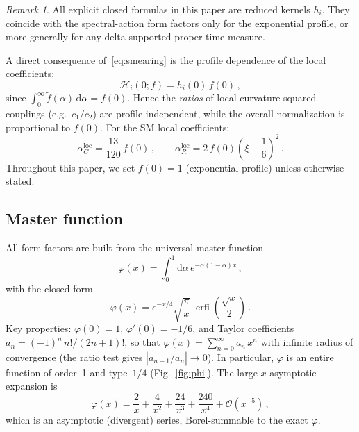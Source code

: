 \documentclass[aps,prd,twocolumn,superscriptaddress,nofootinbib,floatfix]{revtex4-2}
\theoremstyle{definition}
\theoremstyle{remark}
\newtheorem{remark}[theorem]{Remark}
\newcommand{\dd}{\mathrm{d}}
\newcommand{\erfi}{\operatorname{erfi}}
\begin{document}
\begin{remark}
All explicit closed formulas in this paper are reduced kernels $h_i$. They
coincide with the spectral-action form factors only for the exponential
profile, or more generally for any delta-supported proper-time measure.
\end{remark}

A direct consequence of~\eqref{eq:smearing} is the profile dependence of the
local coefficients:
\begin{equation}
  \mathcal{H}_i(0;f) = h_i(0)\,f(0)\,,
  \label{eq:f0-factor}
\end{equation}
since $\int_0^\infty \tilde{f}(\alpha)\,\dd\alpha = f(0)$.
Hence the \emph{ratios} of local curvature-squared couplings (e.g.\
$c_1/c_2$) are profile-independent, while the overall normalization is
proportional to $f(0)$. For the SM local coefficients:
\begin{equation}
  \alpha_C^{\text{loc}} = \frac{13}{120}\,f(0)\,,\qquad
  \alpha_R^{\text{loc}} = 2\,f(0)\!\left(\xi - \frac{1}{6}\right)^{\!2}\,.
  \label{eq:alphaC-local-f}
\end{equation}
Throughout this paper, we set $f(0) = 1$ (exponential profile) unless
otherwise stated.

\subsection{Master function}

All form factors are built from the universal master function
\begin{equation}
  \varphi(x) = \int_0^1 \dd\alpha\, e^{-\alpha(1-\alpha)x}\,,
  \label{eq:phi-def}
\end{equation}
with the closed form
\begin{equation}
  \varphi(x) = e^{-x/4}\sqrt{\frac{\pi}{x}}\;\erfi\!\left(\frac{\sqrt{x}}{2}\right)\,.
  \label{eq:phi-closed}
\end{equation}
Key properties:
$\varphi(0) = 1$,
$\varphi'(0) = -1/6$,
and Taylor coefficients $a_n = (-1)^n\,n!/(2n+1)!$, so that
$\varphi(x) = \sum_{n=0}^\infty a_n\,x^n$ with infinite radius of
convergence (the ratio test gives $|a_{n+1}/a_n| \to 0$). In particular,
$\varphi$ is an entire function of order~1 and type~$1/4$
(Fig.~\ref{fig:phi}). The large-$x$ asymptotic expansion is
\begin{equation}
  \varphi(x) = \frac{2}{x} + \frac{4}{x^2} + \frac{24}{x^3}
    + \frac{240}{x^4} + \mathcal{O}(x^{-5})\,,
  \label{eq:phi-uv}
\end{equation}
which is an asymptotic (divergent) series, Borel-summable to the exact
$\varphi$.
\end{document}
